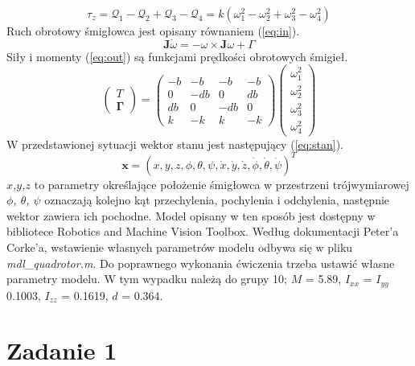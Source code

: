\documentclass[polish,11pt,a4paper]{article}
\begin{document}
\begin{equation}
	\tau_z = \mathcal{Q}_1 - \mathcal{Q}_2 + \mathcal{Q}_3 - \mathcal{Q}_4 = k(\omega_1^2 - \omega_2^2 + \omega_3^2 - \omega_4^2) 
	\label{eq:mz}
\end{equation}
Ruch obrotowy śmigłowca jest opisany równaniem (\ref{eq:in}).
\begin{equation}
	\mathbf{J}\dot{\omega} = -\omega \times \mathbf{J}\omega + \Gamma
	\label{eq:in}
\end{equation}
Siły i momenty (\ref{eq:out}) są funkcjami prędkości obrotowych śmigieł.
\begin{equation}
	\begin{pmatrix}
		T \\ 
		\mathbf{\Gamma}
	\end{pmatrix} = 
	\begin{pmatrix}
		-b & -b & -b & -b \\ 
		0 & -db & 0 & db \\ 
		db & 0 & -db & 0 \\ 
		k & -k & k & -k
	\end{pmatrix}
	\begin{pmatrix}
		\omega_1^2 \\ 
		\omega_2^2 \\ 
		\omega_3^2 \\ 
		\omega_4^2
	\end{pmatrix}
	\label{eq:out}
\end{equation}
W przedstawionej sytuacji wektor stanu jest następujący (\ref{eq:stan}).
\begin{equation}
	\mathbf{x} = (x, y, z, \phi, \theta, \psi, \dot{x}, \dot{y}, \dot{z}, \dot{\phi}, \dot{\theta}, \dot{\psi})^T
	\label{eq:stan}
\end{equation}
\textit{$x$,$y$,$z$} to parametry określające położenie śmigłowca w przestrzeni trójwymiarowej \textit{$\phi$, $\theta$, $\psi$} oznaczają kolejno kąt przechylenia, pochylenia i odchylenia, następnie wektor zawiera ich pochodne. Model opisany w ten sposób jest dostępny w bibliotece Robotics and Machine Vision Toolbox. Według dokumentacji Peter'a Corke'a, wstawienie własnych parametrów modelu odbywa się w pliku \textit{mdl\_quadrotor.m}. Do poprawnego wykonania ćwiczenia trzeba ustawić własne parametry modelu. W tym wypadku należą do grupy 10; $M$ = 5.89, $I_{xx}$ = $I_{yy}$ 0.1003, $I_{zz}$ = 0.1619, $d$ = 0.364.
\section*{Zadanie 1}
\end{document}
